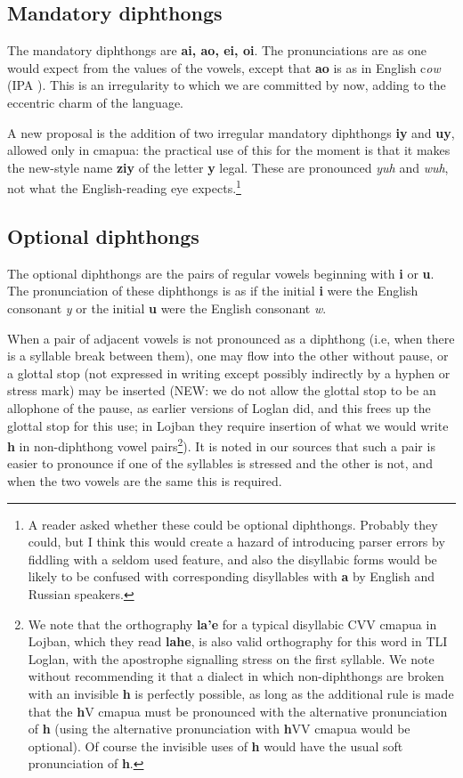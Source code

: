\documentclass[12pt]{book}
\begin{document}
\subsection{Mandatory diphthongs}

The mandatory diphthongs are {\bf ai, ao, ei, oi}.  The pronunciations are as one would expect from the values of the vowels, except that
{\bf ao} is as in English c{\em ow} (IPA ).  This is an irregularity to which we are committed by now, adding to the eccentric charm of the language.

A new proposal is the addition of two irregular mandatory diphthongs {\bf iy} and {\bf uy}, allowed only in cmapua:  the practical use of this
for the moment is that it makes the new-style name {\bf ziy} of the letter {\bf y} legal.  These are pronounced {\em yuh\/} and
{\em wuh\/}, not what the English-reading  eye expects.\footnote{A reader asked whether these could be optional diphthongs.  Probably they could, but I think this would create a hazard of introducing parser errors by fiddling with a seldom used feature, and also the disyllabic forms would be likely to be confused with corresponding disyllables with {\bf a} by English and Russian speakers.}

\subsection{Optional diphthongs}

The optional diphthongs are the pairs of regular vowels beginning with {\bf i} or {\bf u}.  The pronunciation of these diphthongs is as if the initial {\bf i} were the English consonant {\em y} or the initial {\bf u} were the English consonant {\em w}.   

When a pair of adjacent vowels is not pronounced as a diphthong (i.e, when there is a syllable break between them), one may flow into the other without pause, or a glottal stop (not expressed in writing except possibly indirectly by a hyphen or stress mark)  may be inserted (NEW:  we do not allow the glottal stop to be an allophone of the pause, as earlier versions of Loglan did, and this frees up the glottal stop for this use; in Lojban they require insertion of what we would write {\bf h} in non-diphthong vowel pairs\footnote{We note that the orthography {\bf la'e} for a typical disyllabic CVV cmapua in Lojban, which they read {\bf lahe}, is also valid orthography for this word in TLI Loglan, with the apostrophe signalling stress on the first syllable.  We note without recommending it that a dialect in which non-diphthongs are broken with an invisible {\bf h} is perfectly possible, as long as the additional rule is made that the {\bf h}V cmapua must be pronounced with the alternative pronunciation of {\bf h} (using the alternative pronunciation with {\bf h}VV cmapua would be optional).  Of course the invisible uses of {\bf h} would have the usual soft pronunciation of {\bf h}.}).  It is noted in our sources that such a pair is easier to pronounce if one of the syllables is stressed and the other is not, and when the two vowels are the same this is required.  
\end{document}

